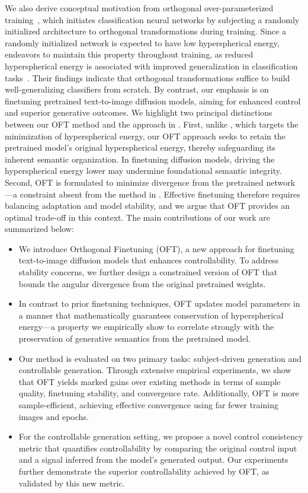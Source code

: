 We also derive conceptual motivation from orthogonal over-parameterized training~\cite{liu2021orthogonal}, which initiates classification neural networks by subjecting a randomly initialized architecture to orthogonal transformations during training. Since a randomly initialized network is expected to have low hyperspherical energy, \cite{liu2021orthogonal} endeavors to maintain this property throughout training, as reduced hyperspherical energy is associated with improved generalization in classification tasks~\cite{liu2018learning,lin2020regularizing}. Their findings indicate that orthogonal transformations suffice to build well-generalizing classifiers from scratch. By contrast, our emphasis is on finetuning pretrained text-to-image diffusion models, aiming for enhanced control and superior generative outcomes. We highlight two principal distinctions between our OFT method and the approach in \cite{liu2021orthogonal}. First, unlike \cite{liu2021orthogonal}, which targets the minimization of hyperspherical energy, our OFT approach seeks to retain the pretrained model's original hyperspherical energy, thereby safeguarding its inherent semantic organization. In finetuning diffusion models, driving the hyperspherical energy lower may undermine foundational semantic integrity. Second, OFT is formulated to minimize divergence from the pretrained network—a constraint absent from the method in \cite{liu2021orthogonal}. Effective finetuning therefore requires balancing adaptation and model stability, and we argue that OFT provides an optimal trade-off in this context. The main contributions of our work are summarized below:

\begin{itemize}[leftmargin=*,nosep]

    \item We introduce Orthogonal Finetuning (OFT), a new approach for finetuning text-to-image diffusion models that enhances controllability. To address stability concerns, we further design a constrained version of OFT that bounds the angular divergence from the original pretrained weights.
    \item In contrast to prior finetuning techniques, OFT updates model parameters in a manner that mathematically guarantees conservation of hyperspherical energy—a property we empirically show to correlate strongly with the preservation of generative semantics from the pretrained model.
    \item Our method is evaluated on two primary tasks: subject-driven generation and controllable generation. Through extensive empirical experiments, we show that OFT yields marked gains over existing methods in terms of sample quality, finetuning stability, and convergence rate. Additionally, OFT is more sample-efficient, achieving effective convergence using far fewer training images and epochs.
    \item For the controllable generation setting, we propose a novel control consistency metric that quantifies controllability by comparing the original control input and a signal inferred from the model’s generated output. Our experiments further demonstrate the superior controllability achieved by OFT, as validated by this new metric.
\end{itemize}

